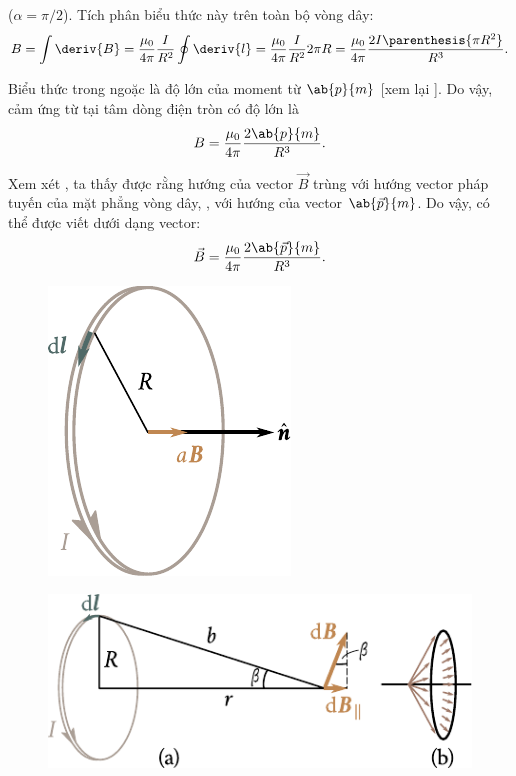 \noindent
($\alpha=\pi/2$). Tích phân biểu thức này trên toàn bộ vòng dây:
\begin{equation*}
    B = \int \deriv{B} = \frac{\mu_0}{4\pi} \frac{I}{R^2} \oint \deriv{l} = \frac{\mu_0}{4\pi} \frac{I}{R^2} 2\pi R = \frac{\mu_0}{4\pi} \frac{2I \parenthesis{\pi R^2}}{R^3}.
\end{equation*}

Biểu thức trong ngoặc là độ lớn của moment từ $\ab{p}{m}$ [xem lại ]. Do vậy, cảm ứng từ tại tâm dòng điện tròn có độ lớn là
\begin{equation}\label{eq:6_78}
    B = \frac{\mu_0}{4\pi} \frac{2\ab{p}{m}}{R^3}.
\end{equation}

Xem xét , ta thấy được rằng hướng của vector $\vec{B}$ trùng với hướng vector pháp tuyến của mặt phẳng vòng dây, \ie, với hướng của vector $\ab{\vec{p}}{m}$. Do vậy,  có thể được viết dưới dạng vector:
\begin{equation}\label{eq:6_79}
    \vec{B} = \frac{\mu_0}{4\pi} \frac{2\ab{\vec{p}}{m}}{R^3}.
\end{equation}

\begin{figure}[t]
	\begin{minipage}[t]{0.35\linewidth}
		\begin{center}
			\includegraphics[scale=0.98]{figures/ch_06/fig_6_18.pdf}
			\caption[]{}
			\label{fig:6_18}
		\end{center}
	\end{minipage}
	\hfill{ }%
	\begin{minipage}[t]{0.61\linewidth}
		\begin{center}
			\includegraphics[scale=0.98]{figures/ch_06/fig_6_19.pdf}
			\caption[]{}
			\label{fig:6_19}
		\end{center}
	\end{minipage}
\vspace{-0.4cm}
\end{figure}

